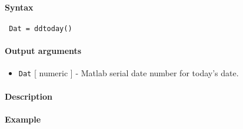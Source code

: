 


	\paragraph{Syntax}
 
 \begin{verbatim}
 Dat = ddtoday()
 \end{verbatim}
 
 \paragraph{Output arguments}
 
 \begin{itemize}
 \item
   \texttt{Dat} {[} numeric {]} - Matlab serial date number for today's
   date.
 \end{itemize}
 
 \paragraph{Description}
 
 \paragraph{Example}



